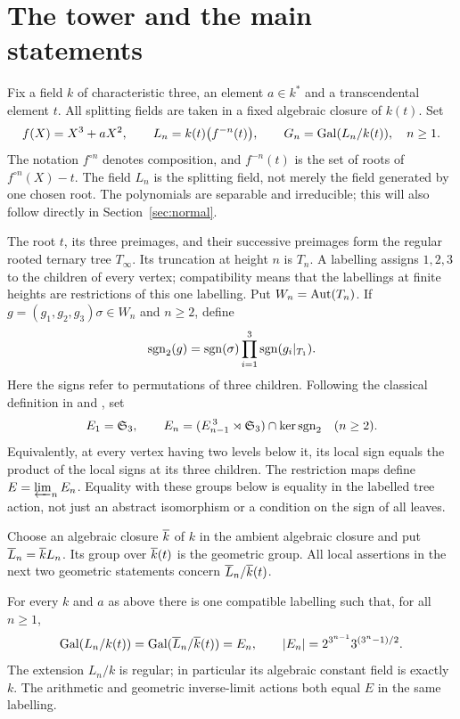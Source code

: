 \section{The tower and the main statements}\label{sec:statements}

Fix a field $k$ of characteristic three, an element $a\in k^*$ and a
transcendental element $t$. All splitting fields are taken in a fixed
algebraic closure of $k(t)$. Set
\[
 f(X)=X^3+aX^2,\qquad
 L_n=k(t)\bigl(f^{-n}(t)\bigr),\qquad
 G_n=\operatorname{Gal}(L_n/k(t)),\quad n\geq1.
\]
The notation $f^{\circ n}$ denotes composition, and $f^{-n}(t)$ is the
set of roots of $f^{\circ n}(X)-t$. The field $L_n$ is the splitting
field, not merely the field generated by one chosen root. The
polynomials are separable and irreducible; this will also follow
directly in Section~\ref{sec:normal}.

The root $t$, its three preimages, and their successive preimages form
the regular rooted ternary tree $T_\infty$. Its truncation at height
$n$ is $T_n$. A labelling assigns $1,2,3$ to the children of every
vertex; compatibility means that the labellings at finite heights are
restrictions of this one labelling. Put $W_n=\operatorname{Aut}(T_n)$. If
$g=(g_1,g_2,g_3)\sigma\in W_n$ and $n\geq2$, define
\[
 \operatorname{sgn}_2(g)=\operatorname{sgn}(\sigma)
             \prod_{i=1}^3\operatorname{sgn}(g_i|_{T_1}).
\]
Here the signs refer to permutations of three children. Following the
classical definition in \cite[Section~2]{benedetto2017cubic} and
\cite[Definition~2.2]{ejder2022arithmetic}, set
\begin{equation}\label{eq:Edefinition}
 E_1=\mathfrak{S}_3,\qquad
 E_n=(E_{n-1}^{\,3}\rtimes\mathfrak{S}_3)\cap\ker\operatorname{sgn}_2\quad(n\geq2).
\end{equation}
Equivalently, at every vertex having two levels below it, its local sign
equals the product of the local signs at its three children. The
restriction maps define $E=\varprojlim_n E_n$. Equality with these
groups below is equality in the labelled tree action, not just an
abstract isomorphism or a condition on the sign of all leaves.

Choose an algebraic closure $\overline{k}$ of $k$ in the ambient algebraic
closure and put $\overline{L}_n=\overline{k} L_n$. Its group over $\overline{k}(t)$ is the
geometric group. All local assertions in the next two geometric
statements concern $\overline{L}_n/\overline{k}(t)$.

\begin{theorem}\label{thm:tower}
For every $k$ and $a$ as above there is one compatible labelling such
that, for all $n\geq1$,
\begin{equation}\label{eq:grouporder}
 \operatorname{Gal}(L_n/k(t))=\operatorname{Gal}(\overline{L}_n/\overline{k}(t))=E_n,
 \qquad |E_n|=2^{3^{n-1}}3^{(3^n-1)/2}.
\end{equation}
The extension $L_n/k$ is regular; in particular its algebraic constant
field is exactly $k$. The arithmetic and geometric inverse-limit
actions both equal $E$ in the same labelling.
\end{theorem}

